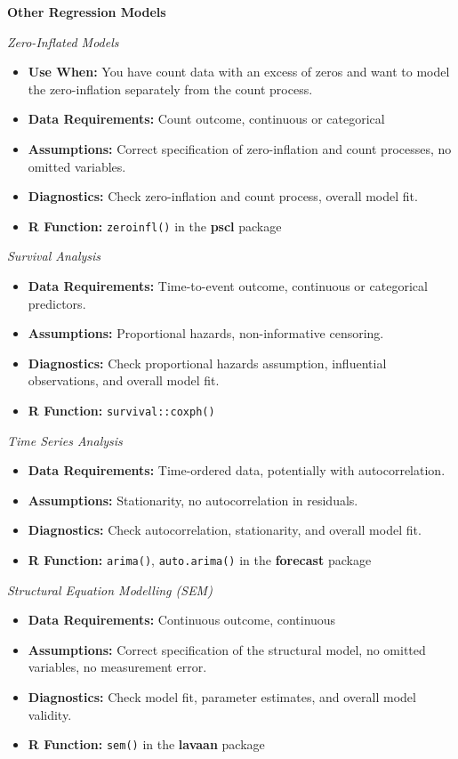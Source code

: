 \documentclass[
  letterpaper,
]{book}
\providecommand{\tightlist}{%
  \setlength{\itemsep}{0pt}\setlength{\parskip}{0pt}}\usepackage{longtable,booktabs,array}
\begin{document}
\textbf{Other Regression Models}

\emph{Zero-Inflated Models}

\begin{itemize}
\tightlist
\item
  \textbf{Use When:} You have count data with an excess of zeros and
  want to model the zero-inflation separately from the count process.
\item
  \textbf{Data Requirements:} Count outcome, continuous or categorical
\item
  \textbf{Assumptions:} Correct specification of zero-inflation and
  count processes, no omitted variables.
\item
  \textbf{Diagnostics:} Check zero-inflation and count process, overall
  model fit.
\item
  \textbf{R Function:} \texttt{zeroinfl()} in the \textbf{pscl} package
\end{itemize}

\emph{Survival Analysis}

\begin{itemize}
\tightlist
\item
  \textbf{Data Requirements:} Time-to-event outcome, continuous or
  categorical predictors.
\item
  \textbf{Assumptions:} Proportional hazards, non-informative censoring.
\item
  \textbf{Diagnostics:} Check proportional hazards assumption,
  influential observations, and overall model fit.
\item
  \textbf{R Function:} \texttt{survival::coxph()}
\end{itemize}

\emph{Time Series Analysis}

\begin{itemize}
\tightlist
\item
  \textbf{Data Requirements:} Time-ordered data, potentially with
  autocorrelation.
\item
  \textbf{Assumptions:} Stationarity, no autocorrelation in residuals.
\item
  \textbf{Diagnostics:} Check autocorrelation, stationarity, and overall
  model fit.
\item
  \textbf{R Function:} \texttt{arima()}, \texttt{auto.arima()} in the
  \textbf{forecast} package
\end{itemize}

\emph{Structural Equation Modelling (SEM)}

\begin{itemize}
\tightlist
\item
  \textbf{Data Requirements:} Continuous outcome, continuous
\item
  \textbf{Assumptions:} Correct specification of the structural model,
  no omitted variables, no measurement error.
\item
  \textbf{Diagnostics:} Check model fit, parameter estimates, and
  overall model validity.
\item
  \textbf{R Function:} \texttt{sem()} in the \textbf{lavaan} package
\end{itemize}
\end{document}
